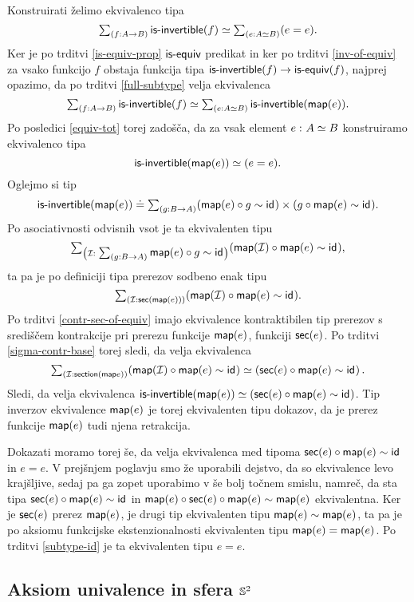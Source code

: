 \begin{dokaz}
  Konstruirati želimo ekvivalenco tipa
  \[\sumtype{f}{A \to B}{\isinv(f)} \simeq \sumtype{e}{A \simeq B}{(e = e)}.\]
  Ker je po trditvi \ref{is-equiv-prop} \(\isequiv\) predikat in ker po trditvi \ref{inv-of-equiv}
  za vsako funkcijo \(f\) obstaja funkcija tipa
  \(\typename{is-invertible}(f) \to \typename{is-equiv}(f)\), najprej opazimo, da po
  trditvi \ref{full-subtype} velja ekvivalenca
  \[\sumtype{f}{A \to B}{\isinv(f)} \simeq
    \sumtype{e}{A \simeq B}{\isinv(\map(e)).}
  \]
  Po posledici \ref{equiv-tot} torej zadošča, da za vsak element \(\dequiv{e}{A}{B}\) konstruiramo ekvivalenco tipa
  \[\isinv(\map(e)) \simeq (e = e).\]
  Oglejmo si tip
  \[\isinv(\map(e)) \doteq \sumtype{g}{B \to A}{(\map(e) \circ g \sim \id{}) \times (g \circ \map(e) \sim \id{})}.\]
  Po asociativnosti odvisnih vsot je ta ekvivalenten tipu
  \[\sumtype{\mathcal{I}}{\sumtype{g}{B \to A}{\map(e) \circ g \sim \id{}}}{(\map(\mathcal{I}) \circ \map(e) \sim \id{})},\]
  ta pa je po definiciji tipa prerezov sodbeno enak tipu
  \[\sumtype{\mathcal{I}}{\sect(\map(e))}{(\map(\mathcal{I}) \circ \map(e) \sim \id{})}.\]
  Po trditvi \ref{contr-sec-of-equiv} imajo ekvivalence kontraktibilen tip prerezov s središčem kontrakcije pri prerezu funkcije \(\map(e)\), funkciji \(\sect(e)\). Po trditvi \ref{sigma-contr-base} torej sledi, da velja ekvivalenca
  \[\sumtype{\mathcal{I}}{\typename{section}(\map e)}{(\map(\mathcal{I}) \circ \map(e) \sim \id{})} \simeq
    \left(\sect(e) \circ \map(e) \sim \id{}\right).\]
  Sledi, da velja ekvivalenca \(\isinv(\map (e)) \simeq (\sect(e) \circ \map(e) \sim \id{})\). Tip inverzov ekvivalence \(\map(e)\) je torej ekvivalenten tipu dokazov, da je prerez funkcije \(\map(e)\) tudi njena retrakcija.

  Dokazati moramo torej še, da velja ekvivalenca med tipoma \(\sect(e) \circ \map(e) \sim \id{}\) in \(e = e\). V prejšnjem poglavju smo že uporabili dejstvo, da so ekvivalence levo krajšljive, sedaj pa ga zopet uporabimo v še bolj točnem smislu, namreč, da sta tipa \(\sect(e) \circ \map(e) \sim \id{}\) in \(\map(e) \circ \sect(e) \circ \map(e) \sim \map(e)\) ekvivalentna. Ker je \(\sect(e)\) prerez \(\map(e)\), je drugi tip ekvivalenten tipu \(\map(e) \sim \map(e)\), ta pa je po aksiomu funkcijske ekstenzionalnosti ekvivalenten tipu \(\map(e) = \map(e)\). Po trditvi \ref{subtype-id} je ta ekvivalenten tipu \(e = e\).
\end{dokaz}


\subsection{Aksiom univalence in sfera \(\sphere{2}\)}

